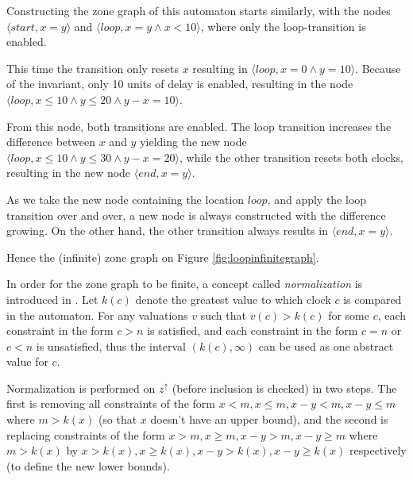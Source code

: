 \begin{example}
Constructing the zone graph of this automaton starts similarly, with the nodes $\langle start, x=y \rangle$ and $\langle loop, x=y \wedge x<10 \rangle$, where only the loop-transition is enabled.

This time the transition only resets $x$ resulting in $\langle loop, x=0 \wedge y=10 \rangle$. Because of the invariant, only 10 units of delay is enabled, resulting in the node $\langle loop, x \leq 10 \wedge y \leq 20 \wedge y-x=10 \rangle$.

From this node, both transitions are enabled. The loop transition increases the difference between $x$ and $y$ yielding the new node $\langle loop, x \leq 10 \wedge y \leq 30 \wedge y-x=20 \rangle$, while the other transition resets both clocks, resulting in the new node $\langle end, x=y \rangle$.

As we take the new node containing the location $loop$, and apply the loop transition over and over, a new node is always constructed with the difference growing. On the other hand, the other transition always results in $\langle end, x=y \rangle$.

Hence the (infinite) zone graph on Figure \ref{fig:loopinfinitegraph}.

\end{example}
	
In order for the zone graph to be finite, a concept called \emph{normalization} is introduced in \cite{bengtsson2004timed}.
Let $k(c)$ denote the greatest value to which clock $c$ is compared in the automaton.
For any valuations $v$ such that $v(c)>k(c)$ for some $c$, each constraint in the form $c > n$ is satisfied, and each constraint in the form $c = n$ or $c < n$ is unsatisfied, thus the interval $(k(c),\infty)$ can be used as one abstract value for $c$. 

Normalization is performed on $z^\uparrow$ (before inclusion is checked) in two steps. The first is removing all constraints of the form $x < m, x \leq m, x-y <m, x-y\leq m$ where $m>k(x)$ (so that $x$ doesn't have an upper bound), and the second is replacing constraints of the form $x > m, x \geq m, x-y >m, x-y\geq m$ where $m>k(x)$ by $x > k(x), x \geq k(x), x-y >k(x), x-y\geq k(x)$ respectively (to define the new lower bounds).

